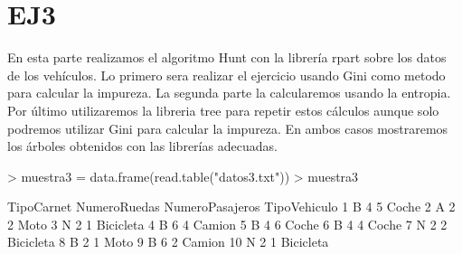 \documentclass [a4paper] {article}
\begin{document}
\section{EJ3}
En esta parte realizamos el algoritmo Hunt con la librería rpart sobre los datos de los vehículos.
Lo primero sera realizar el ejercicio usando Gini como metodo para calcular la impureza.
La segunda parte la calcularemos usando la entropia. 
Por último utilizaremos la libreria tree para repetir estos cálculos aunque solo podremos utilizar Gini para calcular la impureza.
En ambos casos mostraremos los árboles obtenidos con las librerías adecuadas.
\begin{Schunk}
\begin{Sinput}
> muestra3 = data.frame(read.table("datos3.txt"))
> muestra3
\end{Sinput}
\begin{Soutput}
   TipoCarnet NumeroRuedas NumeroPasajeros TipoVehiculo
1           B            4               5        Coche
2           A            2               2         Moto
3           N            2               1    Bicicleta
4           B            6               4       Camion
5           B            4               6        Coche
6           B            4               4        Coche
7           N            2               2    Bicicleta
8           B            2               1         Moto
9           B            6               2       Camion
10          N            2               1    Bicicleta
\end{Soutput}
\end{Schunk}

\newpage
\end{document}
